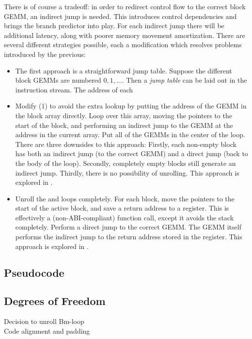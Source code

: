 {There is of course a tradeoff: in order to redirect control flow to the correct block GEMM, an indirect jump is needed. This introduces control dependencies and brings the branch predictor into play. For each indirect jump there will be additional latency, along with poorer memory movement amortization. There are several different strategies possible, each a modification which resolves problems introduced by the previous:

\begin{itemize}
  \item The first approach is a straightforward jump table. Suppose the different block GEMMs are numbered $0,1,...$. Then a \emph{jump table} can be laid out in the instruction stream. The address of each 


  \item Modify (1) to avoid the extra lookup by putting the address of the GEMM in the block array directly. Loop over this array, moving the  pointers to the start of the block, and performing an indirect jump to the GEMM at the address in the current array. Put all of the GEMMs in the center of the loop. There are three downsides to this approach: Firstly, each non-empty block has both an indirect jump (to the correct GEMM) and a direct jump (back to the body of the loop). Secondly, completely empty blocks still generate an indirect jump. Thirdly, there is no possibility of unrolling. This approach is explored in .

  \item Unroll the  and  loops completely. For each block, move the  pointers to the start of the active block, and save a return address to a register. This is effectively a (non-ABI-compliant) function call, except it avoids the stack completely. Perform a direct jump to the correct GEMM. The GEMM itself performs the indirect jump to the return address stored in the register. This approach is explored in .
\end{itemize}

\subsection{Pseudocode}


\subsection{Degrees of Freedom}
\begin{description}
  \item[Decision to unroll Bm-loop] 
  \item[Code alignment and padding]
\end{description}


}

